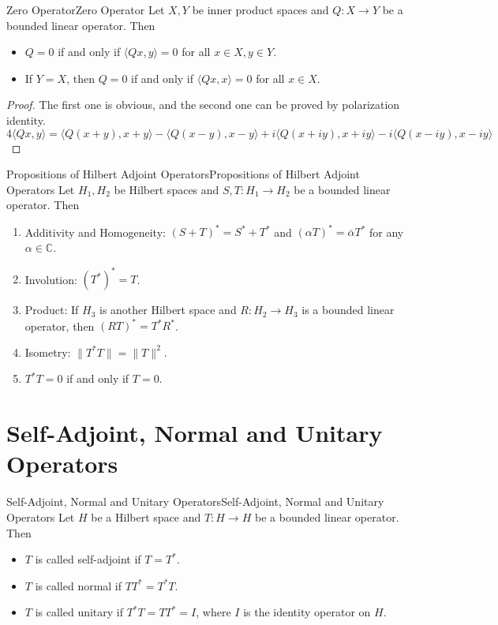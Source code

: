 \documentclass[../main.tex]{subfiles}
\begin{document}
\begin{lemma}{Zero Operator}{Zero Operator}
	Let $X,Y$ be inner product spaces and $Q: X \to Y$ be a bounded linear operator. Then
	\begin{itemize}
		\item $Q=0$ if and only if $\langle Qx, y \rangle = 0$ for all $x\in X,y\in Y$.
		\item If $Y=X$, then $Q=0$ if and only if $\langle Qx, x \rangle = 0$ for all $x\in X$.
	\end{itemize}
\end{lemma}
\begin{proof}
The first one is obvious, and the second one can be proved by polarization identity.
\begin{equation*}
	4\langle Qx, y \rangle = \langle Q(x+y), x+y \rangle - \langle Q(x-y), x-y \rangle + i\langle Q(x+iy), x+iy \rangle - i\langle Q(x-iy), x-iy \rangle
\end{equation*}
\end{proof}

\begin{proposition}{Propositions of Hilbert Adjoint Operators}{Propositions of Hilbert Adjoint Operators}
	Let $H_1,H_2$ be Hilbert spaces and $S,T: H_1 \rightarrow H_2$ be a bounded linear operator. Then
	\begin{enumerate}
		\item Additivity and Homogeneity: $(S+T)^* = S^* + T^*$ and $(\alpha T)^* = \overline{\alpha} T^*$ for any $\alpha \in \mathbb{C}$. 
		\item Involution: $(T^*)^* = T$.
		\item Product: If $H_3$ is another Hilbert space and $R: H_2 \rightarrow H_3$ is a bounded linear operator, then $(RT)^* = T^* R^*$.
		\item Isometry: $\|T^* T\| = \|T\|^2$.
		\item $T^*T = 0$ if and only if $T=0$.
	\end{enumerate}
\end{proposition}

\section{Self-Adjoint, Normal and Unitary Operators}

\begin{definition}{Self-Adjoint, Normal and Unitary Operators}{Self-Adjoint, Normal and Unitary Operators}
	Let $H$ be a Hilbert space and $T: H \to H$ be a bounded linear operator. Then
	\begin{itemize}
		\item $T$ is called self-adjoint if $T = T^*$.
		\item $T$ is called normal if $TT^* = T^* T$.
		\item $T$ is called unitary if $T^* T = TT^* = I$, where $I$ is the identity operator on $H$.
	\end{itemize}
\end{definition}
\end{document}
